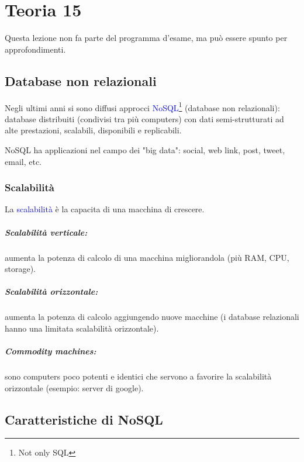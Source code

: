 \chapter{Teoria 15}

Questa lezione non fa parte del programma d'esame, ma può essere spunto per approfondimenti.

\section{Database non relazionali}

Negli ultimi anni si sono diffusi approcci \textcolor{blue}{NoSQL}\footnote{Not only SQL} (database non relazionali): database distribuiti (condivisi tra più computers) con dati semi-strutturati ad alte prestazioni, scalabili, disponibili e replicabili.

NoSQL ha applicazioni nel campo dei "big data": social, web link, post, tweet, email, etc.

\subsection{Scalabilità}

La \textcolor{blue}{scalabilità} è la capacita di una macchina di crescere.

\paragraph{Scalabilità verticale:} aumenta la potenza di calcolo di una macchina migliorandola (più RAM, CPU, storage).

\paragraph{Scalabilità orizzontale:} aumenta la potenza di calcolo aggiungendo nuove macchine (i database relazionali hanno una limitata scalabilità orizzontale).

\paragraph{Commodity machines:} sono computers poco potenti e identici che servono a favorire la scalabilità orizzontale (esempio: server di google).

\section{Caratteristiche di NoSQL}

